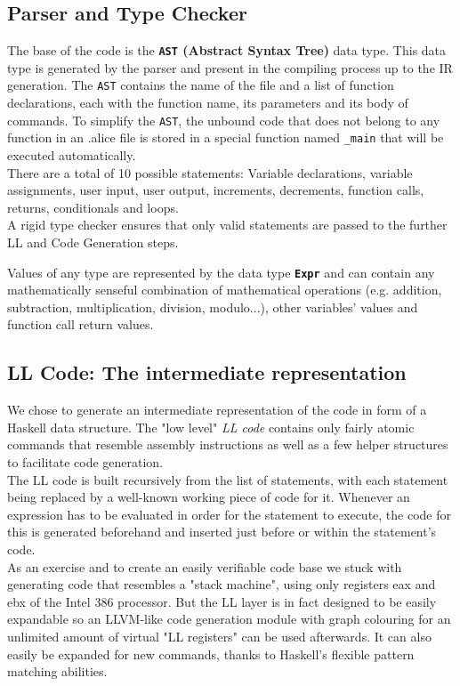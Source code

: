 \documentclass[a4paper]{article}
\begin{document}
\subsection{Parser and Type Checker}
The base of the code is the \textbf{\texttt{AST} (Abstract Syntax
Tree)} data type. This data type is generated by the parser and
present in the compiling process
up to the IR generation. The \texttt{AST} contains the name of the
file and a list of function declarations, each with the function name,
its parameters and its body of commands. To simplify the
\texttt{AST}, the unbound code that does not belong to any function
in an .alice file is stored in a special function named
\texttt{\_main} that will be executed automatically.\\
There are a total of 10 possible statements: Variable declarations,
variable assignments, user input, user output, increments, decrements,
function calls, returns, conditionals and loops.\\
A rigid type checker ensures that only valid statements are passed to the further
LL and Code Generation steps.

Values of any type are represented by the data type
\textbf{\texttt{Expr}} and can contain any mathematically senseful
combination of mathematical
operations (e.g. addition, subtraction, multiplication, division, modulo...),
other variables' values and function call return values.


\subsection{LL Code: The intermediate representation}

We chose to generate an intermediate representation of the code in form
of a Haskell data structure. The "low level" \emph{LL code} contains only
fairly atomic commands that resemble assembly instructions as well as a
few helper structures to facilitate code generation.\\
The LL code is built recursively from the list of statements, with each
statement being replaced by a well-known working piece of code for it.
Whenever an expression has to be evaluated in order for the statement to
execute, the code for this is generated beforehand and inserted just
before or within the statement's code.\\
As an exercise and to create an easily verifiable code base
we stuck with generating code that resembles a "stack machine",
using only registers eax and ebx of the Intel 386 processor. But the LL layer
is in fact designed to be easily expandable so an LLVM-like code generation
module with graph colouring for an unlimited amount of virtual "LL registers"
can be used afterwards. It can also easily be expanded for new commands,
thanks to Haskell's flexible pattern matching abilities.
\end{document}
